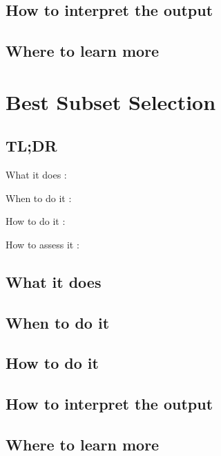 \documentclass[
]{book}
\begin{document}
\hypertarget{how-to-interpret-the-output-10}{%
\section{How to interpret the output}\label{how-to-interpret-the-output-10}}

\hypertarget{where-to-learn-more-10}{%
\section{Where to learn more}\label{where-to-learn-more-10}}

\hypertarget{best-subset-selection}{%
\chapter{Best Subset Selection}\label{best-subset-selection}}

\hypertarget{tldr-11}{%
\section{TL;DR}\label{tldr-11}}

What it does
:

When to do it
:

How to do it
:

How to assess it
:

\hypertarget{what-it-does-11}{%
\section{What it does}\label{what-it-does-11}}

\hypertarget{when-to-do-it-11}{%
\section{When to do it}\label{when-to-do-it-11}}

\hypertarget{how-to-do-it-11}{%
\section{How to do it}\label{how-to-do-it-11}}

\hypertarget{how-to-interpret-the-output-11}{%
\section{How to interpret the output}\label{how-to-interpret-the-output-11}}

\hypertarget{where-to-learn-more-11}{%
\section{Where to learn more}\label{where-to-learn-more-11}}
\end{document}
